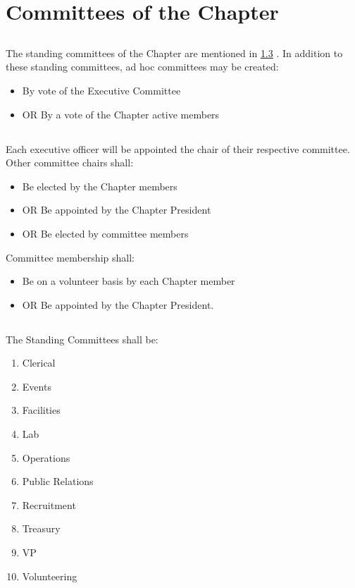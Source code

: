 \documentclass[10pt, oneside]{article}
\begin{document}
\section{Committees of the Chapter}
\subsection{}
The standing committees of the Chapter are mentioned in \ref{committees} . In addition to these standing committees, ad hoc committees may be created:
\begin{itemize}
    \item By vote of the Executive Committee
    \item OR By a vote of the Chapter active members
\end{itemize}


\subsection{}
Each executive officer will be appointed the chair of their respective committee. Other committee chairs shall:
\begin{itemize}
    \item Be elected by the Chapter members
    \item OR Be appointed by the Chapter President
    \item OR Be elected by committee members
\end{itemize}

Committee membership shall:
\begin{itemize}
    \item Be on a volunteer basis by each Chapter member
    \item OR Be appointed by the Chapter President.
\end{itemize}

\subsection{ } \label{committees}
The Standing Committees shall be:
\begin{enumerate}[label=\alph*.]
    \item Clerical
    \item Events
    \item Facilities
    \item Lab
    \item Operations
    \item Public Relations
    \item Recruitment
    \item Treasury
    \item VP
    \item Volunteering
\end{enumerate}
\end{document}
